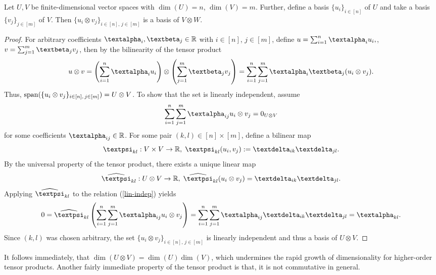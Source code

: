 \documentclass[openany]{book}
\begin{document}
\begin{proposition}\label{basis-tensor-prod}
    Let $U,V$ be finite-dimensional vector spaces with $\dim(U)=n$, $\dim(V)=m$. Further, define a basis $\{u_i\}_{i\in [n]}$ of $U$ and take a basis $\{v_j\}_{j\in [m]}$ of $V$. Then $\{u_i\otimes v_j\}_{i\in[n],\,j\in[m]}$ is a basis of $V\otimes W$.
    \begin{proof}
        For arbitrary coefficients $\galpha_i,\gbeta_j\in \mathbb R$ with $i\in[n]$, $j\in [m]$, define $u= \sum_{i=1}^n\galpha_iu_i,$, $v=\sum_{j=1}^m\gbeta_jv_j$, then by the bilinearity of the tensor product
        \begin{equation*}
            u\otimes v=\left(\sum_{i=1}^n\galpha_iu_i\right)\otimes\left(\sum_{j=1}^m\gbeta_jv_j\right)=\sum_{i=1}^n\sum_{j=1}^m\galpha_i\gbeta_j(u_i\otimes v_j).
        \end{equation*}
        Thus, $\operatorname{span}(\{u_i\otimes v_j\}_{i\in[n],\,j\in[m]})=U\otimes V$. To show that the set is linearly independent, assume 
        \begin{equation}\label{lin-indep}
            \sum_{i=1}^n\sum_{j=1}^m \galpha_{ij}u_i\otimes v_j=0_{U\otimes V}
        \end{equation}
        for some coefficients $\galpha_{ij}\in \mathbb R$. For some pair $(k,l)\in [n]\times [m]$, define a bilinear map
        \begin{equation*}
            \gpsi_{kl}:V\times V\to \mathbb R,\;\gpsi_{kl}(u_i,v_j):=\gdelta_{ik}\gdelta_{jl}.
        \end{equation*}
        By the universal property of the tensor product, there exists a unique linear map
        \begin{equation*}
            \widehat{\gpsi}_{kl}:U\otimes V\to \mathbb R,\;\widehat{\gpsi}_{kl}(u_i\otimes v_j)=\gdelta_{ik}\gdelta_{jl}.
        \end{equation*}
        Applying $\widehat{\gpsi}_{kl}$ to the relation (\ref{lin-indep}) yields
        \begin{equation*}
            0=\widehat{\gpsi}_{kl}\left(\sum_{i=1}^n\sum_{j=1}^m\galpha_{ij}u_i\otimes v_j\right)=\sum_{i=1}^n\sum_{j=1}^m\galpha_{ij}\gdelta_{ik}\gdelta_{jl}=\galpha_{kl}.
        \end{equation*}
        Since $(k,l)$ was chosen arbitrary, the set $\{u_i\otimes v_j\}_{i\in[n],\,j\in[m]}$ is linearly independent and thus a basis of $U\otimes V$.
    \end{proof}
\end{proposition}
It follows immediately, that $\dim(U\otimes V)=\dim(U)\dim(V)$, which undermines the rapid growth of dimensionality for higher-order tensor products. Another fairly immediate property of the tensor product is that, it is not commutative in general. 
\end{document}
